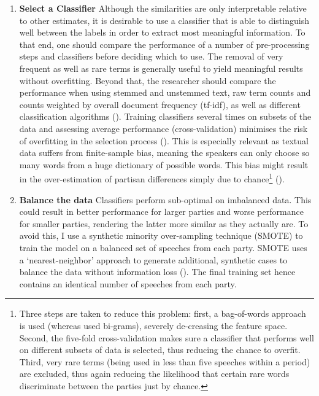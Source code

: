 \documentclass{article}
\begin{document}
\begin{enumerate}
    \item \textbf{Select a Classifier} \newline Although the similarities are only interpretable relative to other estimates, it is desirable to use a classifier that is able to distinguish well between the labels in order to extract most meaningful information. To that end, one should compare the performance of a number of pre-processing steps and classifiers before deciding which to use. The removal of very frequent as well as rare terms is generally useful to yield meaningful results without overfitting. Beyond that, the researcher should compare the performance when using stemmed and unstemmed text, raw term counts and counts weighted by overall document frequency (tf-idf), as well as different classification algorithms (\cite{Denny2017}). Training classifiers several times on subsets of the data and assessing average performance (cross-validation) minimises the risk of overfitting in the selection process (\cite{Breiman1989}). This is especially relevant as textual data suffers from finite-sample bias, meaning the speakers can only choose so many words from a huge dictionary of possible words. This bias might result in the over-estimation of partisan differences simply due to chance\footnote{Three steps are taken to reduce this problem: first, a bag-of-words approach is used (whereas \citeauthor{Gentzkow2019} used bi-grams), severely de-creasing the feature space. Second, the five-fold cross-validation makes sure a classifier that performs well on different subsets of data is selected, thus reducing the chance to overfit. Third, very rare terms (being used in less than five speeches within a period) are excluded, thus again reducing the likelihood that certain rare words discriminate between the parties just by chance.} (\cite{Gentzkow2019}).  \par
    \item \textbf{Balance the data} \newline Classifiers perform sub-optimal on imbalanced data. This could result in better performance for larger parties and worse performance for smaller parties, rendering the latter more similar as they actually are. To avoid this, I use a synthetic minority over-sampling technique (SMOTE) to train the model on a balanced set of speeches from each party. SMOTE uses a ‘nearest-neighbor’ approach to generate additional, synthetic cases to balance the data without information loss (\cite{Chawla2002}). The final training set hence contains an identical number of speeches from each party. \par

\end{enumerate}
\end{document}
